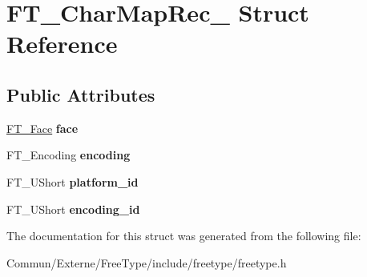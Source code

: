 \hypertarget{struct_f_t___char_map_rec__}{}\section{F\+T\+\_\+\+Char\+Map\+Rec\+\_\+ Struct Reference}
\label{struct_f_t___char_map_rec__}
\subsection*{Public Attributes}
\begin{DoxyCompactItemize}
\item 
\hyperlink{struct_f_t___face_rec__}{F\+T\+\_\+\+Face} {\bfseries face}\hypertarget{struct_f_t___char_map_rec___a70a4e53e3f9818209916e5745c46dc28}{}\label{struct_f_t___char_map_rec___a70a4e53e3f9818209916e5745c46dc28}

\item 
F\+T\+\_\+\+Encoding {\bfseries encoding}\hypertarget{struct_f_t___char_map_rec___a88ee6f726ef11a8e6cc793d59ff5557e}{}\label{struct_f_t___char_map_rec___a88ee6f726ef11a8e6cc793d59ff5557e}

\item 
F\+T\+\_\+\+U\+Short {\bfseries platform\+\_\+id}\hypertarget{struct_f_t___char_map_rec___ae7f439996a8615698e780ce3c4f92457}{}\label{struct_f_t___char_map_rec___ae7f439996a8615698e780ce3c4f92457}

\item 
F\+T\+\_\+\+U\+Short {\bfseries encoding\+\_\+id}\hypertarget{struct_f_t___char_map_rec___af10dd43eee8dc93e7d6191c663ae831a}{}\label{struct_f_t___char_map_rec___af10dd43eee8dc93e7d6191c663ae831a}

\end{DoxyCompactItemize}


The documentation for this struct was generated from the following file\+:\begin{DoxyCompactItemize}
\item 
Commun/\+Externe/\+Free\+Type/include/freetype/freetype.\+h\end{DoxyCompactItemize}

